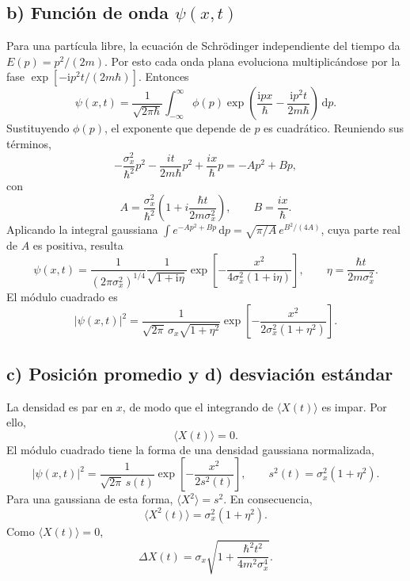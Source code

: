 \documentclass[11pt,a4paper]{article}
\numberwithin{equation}{section}
\renewcommand{\boxed}[1]{#1}
\newcommand{\dd}{\,\mathrm d}
\newcommand{\ii}{\mathrm i}
\newcommand{\hb}{\hbar}
\begin{document}
\subsection*{b) Función de onda $\psi(x,t)$}
Para una partícula libre, la ecuación de Schrödinger independiente del tiempo da $E(p)=p^2/(2m)$. Por esto cada onda plana evoluciona multiplicándose por la fase $\exp[-\ii p^2t/(2m\hb)]$. Entonces
\begin{equation}
\psi(x,t)=\frac{1}{\sqrt{2\pi\hb}}\int_{-\infty}^{\infty}
\phi(p)\exp\left(\frac{\ii px}{\hb}-\frac{\ii p^2t}{2m\hb}\right)\dd p.
\end{equation}
Sustituyendo $\phi(p)$, el exponente que depende de $p$ es cuadrático. Reuniendo sus términos,
\begin{equation}
-\frac{\sigma_x^2}{\hbar^2}p^2-\frac{i t}{2m\hbar}p^2+\frac{i x}{\hbar}p
=-A p^2+B p,
\end{equation}
con
\begin{equation}
A=\frac{\sigma_x^2}{\hbar^2}\left(1+i\frac{\hbar t}{2m\sigma_x^2}\right),
\qquad B=\frac{i x}{\hbar}.
\end{equation}
Aplicando la integral gaussiana $\int e^{-Ap^2+Bp}\,\mathrm dp=\sqrt{\pi/A}\,e^{B^2/(4A)}$, cuya parte real de $A$ es positiva, resulta
\begin{equation}
\boxed{
\psi(x,t)=\frac{1}{(2\pi\sigma_x^2)^{1/4}}
\frac{1}{\sqrt{1+\ii\eta}}
\exp\left[-\frac{x^2}{4\sigma_x^2(1+\ii\eta)}\right],
\qquad
\eta=\frac{\hb t}{2m\sigma_x^2}.}
\end{equation}
El módulo cuadrado es
\begin{equation}
|\psi(x,t)|^2=
\frac{1}{\sqrt{2\pi}\,\sigma_x\sqrt{1+\eta^2}}
\exp\left[-\frac{x^2}{2\sigma_x^2(1+\eta^2)}\right].
\end{equation}

\subsection*{c) Posición promedio y d) desviación estándar}
La densidad es par en $x$, de modo que el integrando de $\langle X(t)\rangle$ es impar. Por ello,
\begin{equation}
\boxed{\langle X(t)\rangle=0.}
\end{equation}
El módulo cuadrado tiene la forma de una densidad gaussiana normalizada,
\begin{equation}
|\psi(x,t)|^2=\frac{1}{\sqrt{2\pi}\,s(t)}\exp\left[-\frac{x^2}{2s^2(t)}\right],
\qquad s^2(t)=\sigma_x^2(1+\eta^2).
\end{equation}
Para una gaussiana de esta forma, $\langle X^2\rangle=s^2$. En consecuencia,
\begin{equation}
\langle X^2(t)\rangle=\sigma_x^2(1+\eta^2).
\end{equation}
Como $\langle X(t)\rangle=0$,
\begin{equation}
\boxed{\Delta X(t)=\sigma_x\sqrt{1+\frac{\hb^2t^2}{4m^2\sigma_x^4}}.}
\end{equation}
\end{document}
